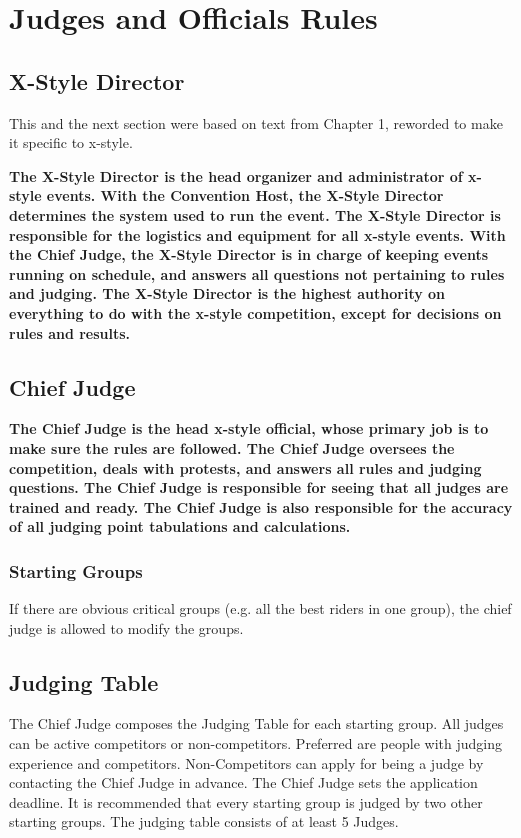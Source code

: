 \chapter{Judges and Officials Rules}

\section{X-Style Director}

\begin{framed}
This and the next section were based on text from Chapter 1, reworded to make it specific to x-style.
\end{framed}

\textbf{The X-Style Director is the head organizer and administrator of x-style
events.  With the Convention Host, the X-Style Director determines the system used to run the event.
The X-Style Director is responsible for the logistics and
equipment for all x-style events.  With the Chief Judge, the
X-Style Director is in charge of keeping events running on schedule, and
answers all questions not pertaining to rules and judging.  The X-Style
Director is the highest authority on everything to do with the x-style
competition, except for decisions on rules and results.}

\section{Chief Judge}

\textbf{The Chief Judge is the head x-style official, whose primary job is to make sure the rules are followed. The Chief Judge oversees the competition, deals with protests, and answers all rules and judging questions.
The Chief Judge is responsible for seeing that all judges are trained and ready. The Chief Judge is also responsible for the accuracy of all judging point tabulations and calculations.}

\subsection{Starting Groups}
If there are obvious critical groups (e.g. all the best riders in one group), the chief judge is allowed to modify the groups.

\section{Judging Table}

The Chief Judge composes the Judging Table for each starting group.
All judges can be active competitors or non-competitors.
Preferred are people with judging experience and competitors.
Non-Competitors can apply for being a judge by contacting the Chief Judge in advance.
The Chief Judge sets the application deadline.
It is recommended that every starting group is judged by two other starting groups.
The judging table consists of at least 5 Judges.

